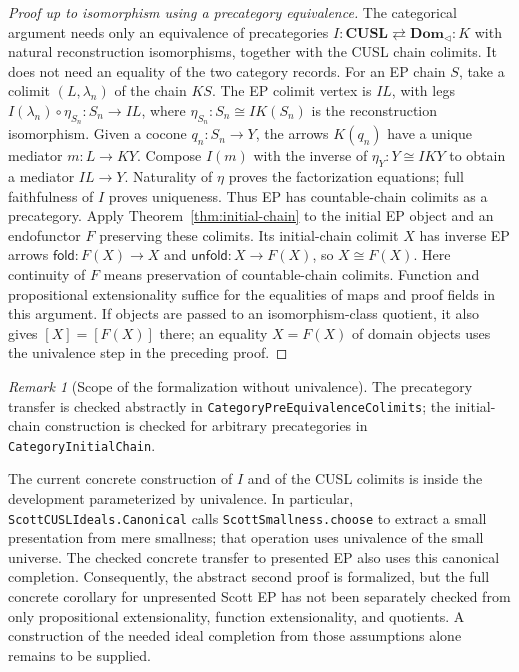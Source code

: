\documentclass[11pt,a4paper]{article}
\theoremstyle{definition}
\theoremstyle{remark}
\newtheorem{remark}[theorem]{Remark}
\begin{document}
\begin{proof}[Proof up to isomorphism using a precategory equivalence]
The categorical argument needs only an equivalence of precategories
$I:\mathbf{CUSL}\rightleftarrows\mathbf{Dom}_{\triangleleft}:K$
with natural reconstruction isomorphisms, together with the CUSL chain
colimits. It does not need an equality of the two category records.
For an EP chain $S$, take a colimit $(L,\lambda_n)$ of the chain $KS$.
The EP colimit vertex is $I L$, with legs
$I(\lambda_n)\circ\eta_{S_n}:S_n\to I L$, where
$\eta_{S_n}:S_n\cong IK(S_n)$ is the reconstruction isomorphism.
Given a cocone $q_n:S_n\to Y$, the arrows $K(q_n)$ have a unique
mediator $m:L\to K Y$. Compose $I(m)$ with the inverse of
$\eta_Y:Y\cong IKY$ to obtain a mediator $IL\to Y$.
Naturality of $\eta$ proves the factorization equations; full
faithfulness of $I$ proves uniqueness. Thus EP has countable-chain
colimits as a precategory. Apply Theorem~\ref{thm:initial-chain} to the
initial EP object and an endofunctor $F$ preserving these colimits.
Its initial-chain colimit $X$ has inverse EP arrows
$\mathsf{fold}:F(X)\to X$ and $\mathsf{unfold}:X\to F(X)$, so
$X\cong F(X)$. Here continuity of $F$ means preservation of
countable-chain colimits. Function and propositional extensionality suffice for
the equalities of maps and proof fields in this argument. If objects
are passed to an isomorphism-class quotient, it also gives
$[X]=[F(X)]$ there; an equality $X=F(X)$ of domain objects uses the
univalence step in the preceding proof.
\end{proof}

\begin{remark}[Scope of the formalization without univalence]
The precategory transfer is checked abstractly in
\texttt{CategoryPreEquivalenceColimits}; the initial-chain
construction is checked for arbitrary precategories in
\texttt{CategoryInitialChain}.

The current concrete construction of $I$ and of the CUSL colimits is
inside the development parameterized by univalence. In particular,
\texttt{ScottCUSLIdeals.Canonical} calls
\texttt{ScottSmallness.choose} to extract a small presentation from
mere smallness; that operation uses univalence of the small universe.
The checked concrete transfer to presented EP also uses this canonical
completion. Consequently, the abstract second proof is formalized,
but the full concrete corollary for unpresented Scott EP has not been
separately checked from only propositional extensionality, function
extensionality, and quotients. A construction
of the needed ideal completion from those assumptions alone remains
to be supplied.
\end{remark}
\end{document}
